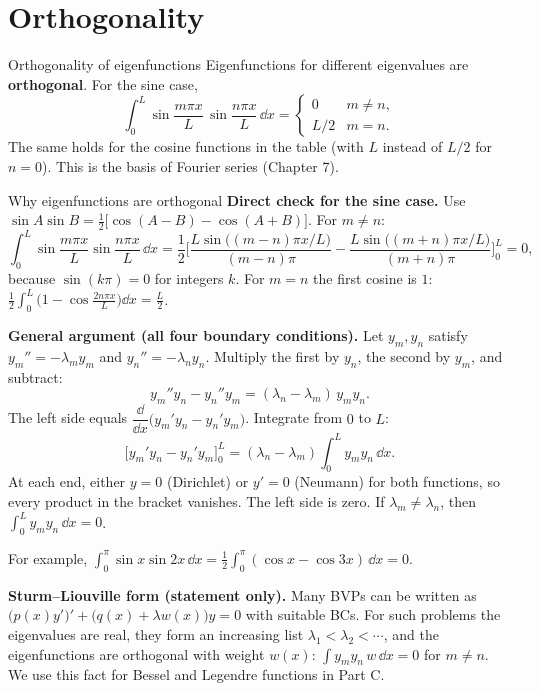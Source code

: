 \section{Orthogonality}

\begin{defbox}{Orthogonality of eigenfunctions}
Eigenfunctions for different eigenvalues are \textbf{orthogonal}. For the sine case,
\[ \int_0^L \sin\frac{m\pi x}{L}\,\sin\frac{n\pi x}{L}\,\dd x = \begin{cases}0 & m\neq n,\\[2pt] L/2 & m=n.\end{cases} \]
The same holds for the cosine functions in the table (with $L$ instead of $L/2$ for $n=0$). This is the basis of Fourier series (Chapter 7).
\end{defbox}

\begin{derivbox}{Why eigenfunctions are orthogonal}
\textbf{Direct check for the sine case.} Use $\sin A\sin B = \frac12\big[\cos(A-B) - \cos(A+B)\big]$. For $m\neq n$:
\[ \int_0^L\sin\frac{m\pi x}{L}\sin\frac{n\pi x}{L}\,\dd x = \frac12\Big[\frac{L\sin\big((m-n)\pi x/L\big)}{(m-n)\pi} - \frac{L\sin\big((m+n)\pi x/L\big)}{(m+n)\pi}\Big]_0^L = 0, \]
because $\sin(k\pi)=0$ for integers $k$. For $m = n$ the first cosine is $1$: $\frac12\int_0^L\big(1 - \cos\frac{2n\pi x}{L}\big)\dd x = \frac L2$.

\textbf{General argument (all four boundary conditions).} Let $y_m, y_n$ satisfy $y_m'' = -\lambda_my_m$ and $y_n'' = -\lambda_ny_n$. Multiply the first by $y_n$, the second by $y_m$, and subtract:
\[ y_m''y_n - y_n''y_m = (\lambda_n - \lambda_m)\,y_my_n. \]
The left side equals $\dfrac{\dd}{\dd x}\big(y_m'y_n - y_n'y_m\big)$. Integrate from $0$ to $L$:
\[ \Big[y_m'y_n - y_n'y_m\Big]_0^L = (\lambda_n - \lambda_m)\int_0^Ly_my_n\,\dd x. \]
At each end, either $y=0$ (Dirichlet) or $y'=0$ (Neumann) for both functions, so every product in the bracket vanishes. The left side is zero. If $\lambda_m\neq\lambda_n$, then $\int_0^Ly_my_n\,\dd x = 0$.
\end{derivbox}

For example, $\displaystyle\int_0^\pi\sin x\sin 2x\,\dd x = \tfrac12\int_0^\pi(\cos x - \cos 3x)\,\dd x = 0$.

\textbf{Sturm--Liouville form (statement only).} Many BVPs can be written as $\big(p(x)y'\big)' + \big(q(x) + \lambda w(x)\big)y = 0$ with suitable BCs. For such problems the eigenvalues are real, they form an increasing list $\lambda_1<\lambda_2<\cdots$, and the eigenfunctions are orthogonal with weight $w(x)$: $\int y_my_n\,w\,\dd x = 0$ for $m\neq n$. We use this fact for Bessel and Legendre functions in Part C.

